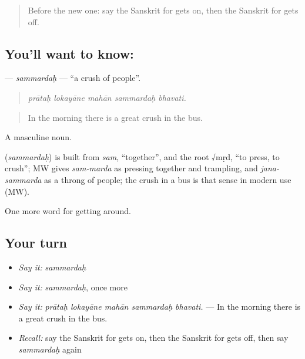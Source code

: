 \label{lesson:SA-C406-sammardah}



\begin{quote}
Before the new one: say the Sanskrit for gets on, then the Sanskrit for gets off.
\end{quote}

\subsection*{You'll want to know: }
\textbf{} — \emph{sammardaḥ} — \textquotedblleft{}a crush of people\textquotedblright{}.

\begin{quote}
    
\end{quote}

\begin{quote}
\emph{prātaḥ lokayāne mahān sammardaḥ bhavati.}
\end{quote}

\begin{quote}
In the morning there is a great crush in the bus.
\end{quote}

A masculine noun.

\begin{cousinweb}
\textbf{} (\emph{sammardaḥ}) is built from \emph{sam}, \textquotedblleft{}together\textquotedblright{}, and the root √mṛd, \textquotedblleft{}to press, to crush\textquotedblright{}; MW gives \emph{sam-marda} as pressing together and trampling, and \emph{jana-sammarda} as a throng of people; the crush in a bus is that sense in modern use (MW).
\end{cousinweb}

\begin{grammarlens}[title={What you've built}]
One more word for getting around.
\end{grammarlens}

\subsection*{Your turn}
\begin{itemize}
\raggedright
  \item \emph{Say it:} \emph{sammardaḥ}
  \item \emph{Say it:} \emph{sammardaḥ}, once more
  \item \emph{Say it:} \emph{prātaḥ lokayāne mahān sammardaḥ bhavati.} — In the morning there is a great crush in the bus.
  \item \emph{Recall:} say the Sanskrit for gets on, then the Sanskrit for gets off, then say \emph{sammardaḥ} again
\end{itemize}

